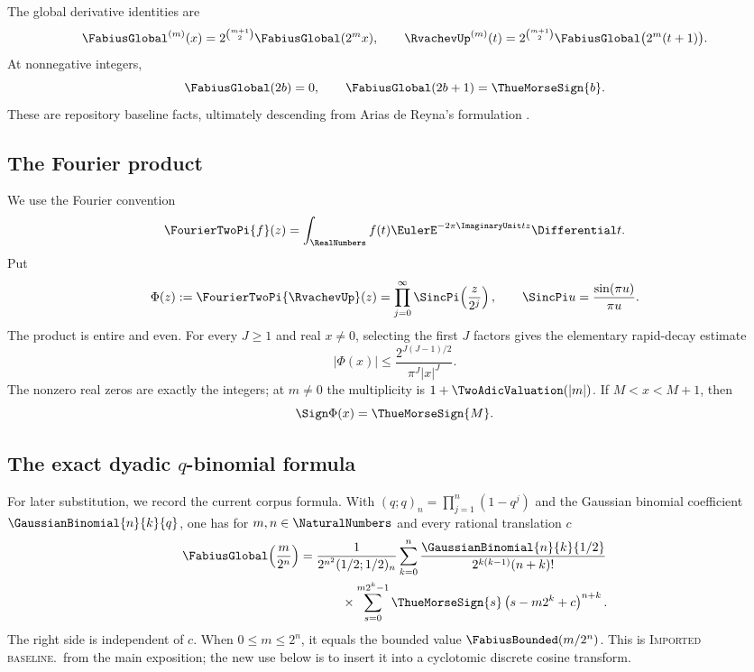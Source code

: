 \documentclass[11pt,oneside]{article}
\theoremstyle{definition}
\theoremstyle{remark}
\newcommand{\PhiU}{\Phi}
\newcommand{\imported}{\textcolor{importblue}{\textsc{Imported baseline.}}}
\begin{document}
The global derivative identities are
\begin{equation}\label{p1:eq:global-derivatives}
 \FabiusGlobal^{(m)}(x)=2^{\binom{m+1}{2}}\FabiusGlobal(2^m x),
 \qquad
 \RvachevUp^{(m)}(t)=2^{\binom{m+1}{2}}\FabiusGlobal\bigl(2^m(t+1)\bigr).
\end{equation}
At nonnegative integers,
\begin{equation}\label{p1:eq:global-integers}
 \FabiusGlobal(2b)=0,
 \qquad
 \FabiusGlobal(2b+1)=\ThueMorseSign{b}.
\end{equation}
These are repository baseline facts, ultimately descending from Arias de Reyna's
formulation \cite{p1:ariascompact,p1:ariasarith}.

\subsection{The Fourier product}

We use the Fourier convention
\[
 \FourierTwoPi{f}(z)=\int_{\RealNumbers}f(t)\EulerE^{-2\pi\ImaginaryUnit tz}\Differential t.
\]
Put
\begin{equation}\label{p1:eq:Phi-def}
 \PhiU(z):=\FourierTwoPi{\RvachevUp}(z)
 =\prod_{j=0}^{\infty}\SincPi\!\left(\frac z{2^j}\right),
 \qquad
 \SincPi u=\frac{\sin(\pi u)}{\pi u}.
\end{equation}
The product is entire and even.  For every $J\ge1$ and real $x\ne0$,
selecting the first $J$ factors gives the elementary rapid-decay estimate
\begin{equation}\label{p1:eq:Phi-power-bound-baseline}
 |\PhiU(x)|\le
 \frac{2^{J(J-1)/2}}{\pi^J|x|^J}.
\end{equation}
The nonzero real zeros are exactly the integers; at $m\ne0$ the multiplicity is
$1+\TwoAdicValuation(|m|)$.  If $M<x<M+1$, then
\begin{equation}\label{p1:eq:Phi-sign-law}
 \Sign \PhiU(x)=\ThueMorseSign{M}.
\end{equation}

\subsection{The exact dyadic \texorpdfstring{$q$}{q}-binomial formula}

For later substitution, we record the current corpus formula.  With
$(q;q)_n=\prod_{j=1}^n(1-q^j)$ and the Gaussian binomial coefficient
$\GaussianBinomial{n}{k}{q}$, one has for $m,n\in\NaturalNumbers$ and every rational translation $c$
\begin{equation}\label{p1:eq:baseline-qbinomial}
\begin{aligned}
 \FabiusGlobal\!\left(\frac{m}{2^n}\right)
 ={}&\frac{1}{2^{n^2}(1/2;1/2)_n}
 \sum_{k=0}^{n}
 \frac{\GaussianBinomial{n}{k}{1/2}}
      {2^{k(k-1)}(n+k)!}\\
 &\qquad\times
 \sum_{s=0}^{m2^k-1}\ThueMorseSign{s}
 \left(s-m2^k+c\right)^{n+k}.
\end{aligned}
\end{equation}
The right side is independent of $c$.  When $0\le m\le2^n$, it equals the
bounded value $\FabiusBounded(m/2^n)$.  This is \imported\ from the main exposition; the
new use below is to insert it into a cyclotomic discrete cosine transform.
\end{document}

